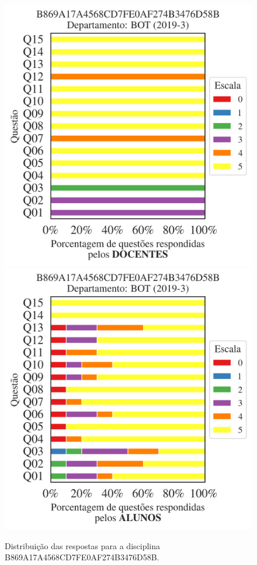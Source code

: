 \documentclass[a4paper,10pt]{article}
\begin{document}
\begin{figure}[h]
\centering
\includegraphics[width=0.485\linewidth]{analise_disciplina_departamento_BOT_B869A17A4568CD7FE0AF274B3476D58B_docentes.png}
\includegraphics[width=0.485\linewidth]{analise_disciplina_departamento_BOT_B869A17A4568CD7FE0AF274B3476D58B_alunos.png}
\caption{\label{fig:analise_geral_departamento}                Distribuição das respostas para a disciplina B869A17A4568CD7FE0AF274B3476D58B. }
\end{figure}
\end{document}
